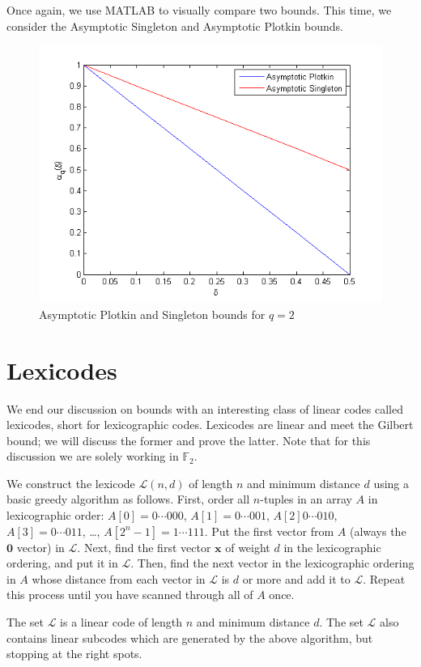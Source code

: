 \documentclass{article}
\theoremstyle{plain}
\theoremstyle{definition}
\begin{document}
Once again, we use MATLAB to visually compare two bounds.  This time, we consider the Asymptotic Singleton and Asymptotic Plotkin bounds.  

\begin{figure}[ht]
\includegraphics[width=.8\linewidth]{asympt.png}
\caption{Asymptotic Plotkin and Singleton bounds for $q=2$}
\end{figure}

\section{Lexicodes}

We end our discussion on bounds with an interesting class of linear codes
called lexicodes, short for lexicographic codes.  Lexicodes are linear and meet the Gilbert bound; we will discuss the former and prove the latter.  Note that for this discussion we are 
solely working in $\mathbb{F}_2$.

We construct the lexicode $\mathcal{L}(n,d)$ of length $n$ and minimum distance $d$ using a basic greedy algorithm as follows.  First, order all $n$-tuples in an array $A$ in lexicographic order:
$A[0] = 0\cdots000$, $A[1]=0\cdots001$, $A[2]0\cdots010$, $A[3]=0\cdots011$, \ldots, $A[2^n-1] = 1\cdots111$.  Put the first vector from  $A$ (always the $\mathbf{0}$ vector) in $\mathcal{L}$.  Next, find the first vector $\mathbf{x}$
of weight $d$ in the lexicographic ordering, and put it in $\mathcal{L}$.  Then, find the next vector in the lexicographic ordering in $A$ whose distance from each vector in $\mathcal{L}$ is 
$d$ or more and add it to $\mathcal{L}$.  Repeat this process until you have scanned through all of $A$ once.

The set $\mathcal{L}$ is a linear code of length $n$ and minimum distance $d$.  The set $\mathcal{L}$ also contains linear subcodes which are generated by the above algorithm,
but stopping at the right spots.
\end{document}
